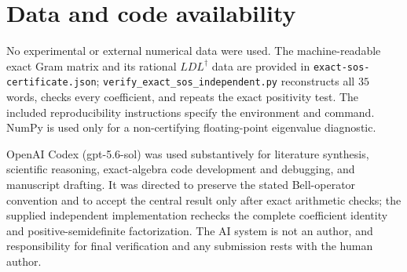 \documentclass[aps,pra,reprint,superscriptaddress,nofootinbib,longbibliography]{revtex4-2}
\begin{document}
\section*{Data and code availability}

No experimental or external numerical data were used.  The machine-readable
exact Gram matrix and its rational $LDL^\dagger$ data are provided in
\nolinkurl{exact-sos-certificate.json};
\nolinkurl{verify_exact_sos_independent.py} reconstructs all $35$ words,
checks every coefficient, and repeats the exact positivity test.  The included
reproducibility instructions specify the environment and command.  NumPy is
used only for a non-certifying floating-point eigenvalue diagnostic.

\begin{acknowledgments}
OpenAI Codex (gpt-5.6-sol) was used substantively for literature synthesis,
scientific reasoning, exact-algebra code development and debugging, and
manuscript drafting.  It was directed to preserve the stated Bell-operator
convention and to accept the central result only after exact arithmetic checks;
the supplied independent implementation rechecks the complete coefficient
identity and positive-semidefinite factorization.  The AI system is not an
author, and responsibility for final verification and any submission rests
with the human author.
\end{acknowledgments}


\end{document}
